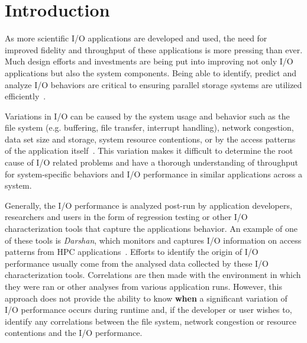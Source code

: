\section{Introduction}
As more scientific I/O applications are developed and used, the need for
improved fidelity and throughput of these applications is more pressing than ever. 
Much design efforts and investments are being put into improving not only
I/O applications but also the system components. Being able to
identify, predict and analyze I/O behaviors are critical to ensuring
parallel storage systems are utilized efficiently~\cite{costa2021}. 


Variations in I/O can be caused by the system usage and behavior such as the file system (e.g. buffering, file transfer,
interrupt handling), network congestion, data set size and storage, system resource contentions,
or by the access patterns of the application itself~\cite{I/O-performance-variation}.
This variation
makes it difficult to determine the root cause of I/O related problems
and have a thorough understanding of throughput for system-specific
behaviors and I/O performance in similar applications across a
system. 

Generally, the I/O performance is analyzed post-run by application
developers, researchers and users in the form of regression testing or
other I/O characterization tools that capture the applications behavior. An example of one of these tools is \emph{Darshan}, which
monitors and captures I/O information on access patterns from HPC
applications~\cite{Darshan}.
Efforts to identify the origin of I/O performance usually come from the analysed data 
collected by these I/O characterization tools. Correlations are then made with the environment 
in which they were ran or other analyses from various application runs.
However, this approach does not provide the ability to know
\textbf{when} a significant variation of I/O performance occurs during runtime and, if the developer or user wishes to, identify any
correlations between the file system, network congestion or resource
contentions and the I/O performance.

